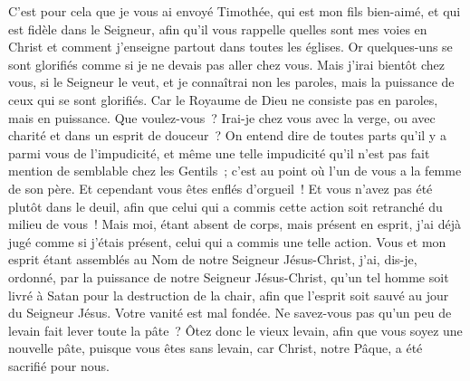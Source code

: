 \begin{multicols}{2}
C'est pour cela que je vous ai envoyé Timothée, qui est mon fils bien-aimé, et qui est fidèle dans le Seigneur, afin qu'il vous rappelle quelles sont mes voies en Christ et comment j'enseigne partout dans toutes les églises.
Or quelques-uns se sont glorifiés comme si je ne devais pas aller chez vous.
Mais j'irai bientôt chez vous, si le Seigneur le veut, et je connaîtrai non les paroles, mais la puissance de ceux qui se sont glorifiés.
Car le Royaume de Dieu ne consiste pas en paroles, mais en puissance.
Que voulez-vous~? Irai-je chez vous avec la verge, ou avec charité et dans un esprit de douceur~?
\VerseOne{}On entend dire de toutes parts qu'il y a parmi vous de l'impudicité, et même une telle impudicité qu'il n'est pas fait mention de semblable chez les Gentils~; c'est au point où l'un de vous a la femme de son père.
Et cependant vous êtes enflés d'orgueil~! Et vous n'avez pas été plutôt dans le deuil, afin que celui qui a commis cette action soit retranché du milieu de vous~!
Mais moi, étant absent de corps, mais présent en esprit, j'ai déjà jugé comme si j'étais présent, celui qui a commis une telle action.
Vous et mon esprit étant assemblés au Nom de notre Seigneur Jésus-Christ, j'ai, dis-je, ordonné, par la puissance de notre Seigneur Jésus-Christ,
qu'un tel homme soit livré à Satan pour la destruction de la chair, afin que l'esprit soit sauvé au jour du Seigneur Jésus.
Votre vanité est mal fondée. Ne savez-vous pas qu'un peu de levain fait lever toute la pâte~?
Ôtez donc le vieux levain, afin que vous soyez une nouvelle pâte, puisque vous êtes sans levain, car Christ, notre Pâque, a été sacrifié pour nous.

\end{multicols}
